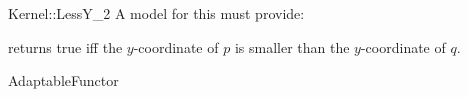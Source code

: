 \begin{ccRefFunctionObjectConcept}{Kernel::LessY_2}
A model for this must provide:


{returns true iff the $y$-coordinate of $p$ is smaller than the
$y$-coordinate of $q$.}

\ccRefines
AdaptableFunctor

\ccSeeAlso
{}\\


\end{ccRefFunctionObjectConcept}
